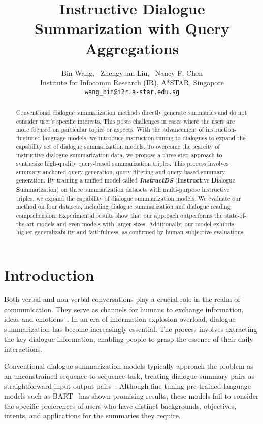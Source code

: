 \documentclass[11pt]{article}
\title{Instructive Dialogue Summarization with Query Aggregations}
\author{
Bin Wang,
\  Zhengyuan Liu,
\  Nancy F. Chen \\
Institute for Infocomm Research (IR), A*STAR, Singapore\\
\texttt{wang\_bin@i2r.a-star.edu.sg}
}
\begin{document}
\maketitle
\begin{abstract}

    Conventional dialogue summarization methods directly generate summaries and do not consider user's specific interests. This poses challenges in cases where the users are more focused on particular topics or aspects. With the advancement of instruction-finetuned language models, we introduce instruction-tuning to dialogues to expand the capability set of dialogue summarization models. To overcome the scarcity of instructive dialogue summarization data, we propose a three-step approach to synthesize high-quality query-based summarization triples. This process involves summary-anchored query generation, query filtering and query-based summary generation. By training a unified model called \textbf{\emph{InstructDS}} (\textbf{Instruct}ive \textbf{D}ialogue \textbf{S}ummarization) on three summarization datasets with multi-purpose instructive triples, we expand the capability of dialogue summarization models. We evaluate our method on four datasets, including dialogue summarization and dialogue reading comprehension. Experimental results show that our approach outperforms the state-of-the-art models and even models with larger sizes. Additionally, our model exhibits higher generalizability and faithfulness, as confirmed by human subjective evaluations.
    
\end{abstract}

\section{Introduction}

    Both verbal and non-verbal conversations play a crucial role in the realm of communication. They serve as channels for humans to exchange information, ideas and emotions~\cite{kester2004conversation}. In an era of information explosion overload, dialogue summarization has become increasingly essential. The process involves extracting the key dialogue information, enabling people to grasp the essence of their daily interactions. 
    
    Conventional dialogue summarization models typically approach the problem as an unconstrained sequence-to-sequence task, treating dialogue-summary pairs as straightforward input-output pairs~\cite{shang-etal-2018-unsupervised,goo2018abstractive,chen-yang-2020-multi}. Although fine-tuning pre-trained language models such as BART~\cite{lewis-etal-2020-bart} has shown promising results, these models fail to consider the specific preferences of users who have distinct backgrounds, objectives, intents, and applications for the summaries they require.
    
\end{document}
